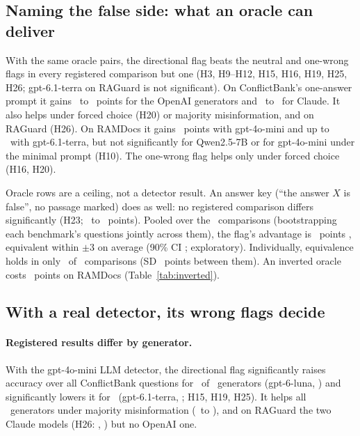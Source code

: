 \subsection{Naming the false side: what an oracle can deliver}
\label{sec:direction}
With the same oracle pairs, the directional flag beats the neutral and one-wrong flags in every registered comparison
but one (H3, H9--H12, H15, H16, H19, H25, H26; gpt-6.1-terra on RAGuard is not significant). On ConflictBank's
one-answer prompt it gains \azSgTerraOracleFlagDirectionalConflict\ to \azSgLunaOracleFlagDirectionalConflict\
points for the OpenAI generators and \azSgSonnetOracleFlagDirectionalConflict\ to
\azSgHaikuOracleFlagDirectionalConflict\ for Claude. It also helps under forced choice (H20) or majority
misinformation, and on RAGuard (H26). On RAMDocs it gains \adOracleDirConf\ points with gpt-4o-mini and
up to \azRdTerraOracleFlagDirectionalConflict\ with gpt-6.1-terra, but not significantly for Qwen2.5-7B or for
gpt-4o-mini under the minimal prompt (H10). The one-wrong flag helps only under forced choice (H16, H20).

Oracle rows are a ceiling, not a detector result. An answer key (``the answer $X$ is false'', no passage
marked) does as well: no registered comparison differs significantly (H23; \keyDiffMin\ to \keyDiffMax\ points).
Pooled over the \PoolTwentyThreeK\ comparisons (bootstrapping each benchmark's questions
jointly across them), the flag's advantage is \PoolTwentyThree\ points \PoolTwentyThreeCI, equivalent within $\pm$3 on average
(90\% CI \PoolTwentyThreeCINinety; exploratory). Individually, equivalence holds in only \hTwentyThreeEqN\ of
\hTwentyThreeK\ comparisons (SD \hTwentyThreeTau\ points between them). An inverted oracle
costs \aadvDirConf\ points on RAMDocs (Table~\ref{tab:inverted}).

\subsection{With a real detector, its wrong flags decide}
\label{sec:real}
\paragraph{Registered results differ by generator.} With the gpt-4o-mini LLM detector, the directional flag significantly raises
accuracy over all ConflictBank questions for \nRealSgPos\ of \nRealSgTests\ generators (gpt-6-luna,
\zSgLunaLlmDirFlagDirectionalLabelled) and significantly lowers it for \nRealSgNeg\ (gpt-6.1-terra,
\zSgTerraLlmDirFlagDirectionalLabelled; H15, H19, H25). It helps all \nRealMjTests\ generators under majority
misinformation (\zMjMiniLlmDirFlagDirectionalConflict\ to \zMjTerraLlmDirFlagDirectionalConflict), and on RAGuard the
two Claude models (H26: \hTwentySixRgHaikuLlm, \hTwentySixRgSonnetLlm) but no OpenAI one.

